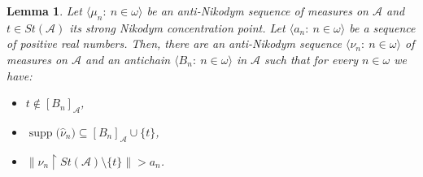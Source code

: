 \documentclass[10pt,a4paper]{amsart}
\newtheorem{lemma}{Lemma}
\newcommand{\N}{\mathbb{N}}
\newcommand{\aA}{\mathcal{A}}
\newcommand{\clopen}[1]{\left[#1\right]}
\newcommand{\io}{\in\omega}%
\newcommand{\rstr}{\restriction}
\newcommand{\seqn}[1]{\big\langle#1\colon\ n\io\big\rangle}
\newcommand{\sm}{\setminus}
\newcommand{\sub}{\subseteq}
\DeclareMathOperator{\supp}{supp}
\newcommand{\wh}{\widehat}
\begin{document}
\begin{lemma}\label{lemma:aN_disjointification}
Let $\seqn{\mu_n}$ be an anti-Nikodym sequence of measures on $\aA$ and $t\in St(\aA)$ its strong Nikodym concentration point. Let $\seqn{a_n}$ be a sequence of positive real numbers. Then, there are an anti-Nikodym sequence $\seqn{\nu_n}$ of measures on $\aA$ and an antichain $\seqn{B_n}$ in $\aA$ such that for every $n\io$ we have:
\begin{itemize}
	\item $t\not\in\clopen{B_n}_\aA$,
	\item $\supp\big(\wh{\nu}_n\big)\sub\clopen{B_n}_\aA\cup\{t\}$,
	\item $\big\|\wh{\nu}_n\rstr St(\aA)\sm\{t\}\big\|>a_n$.
\end{itemize}
\end{lemma}
\end{document}
